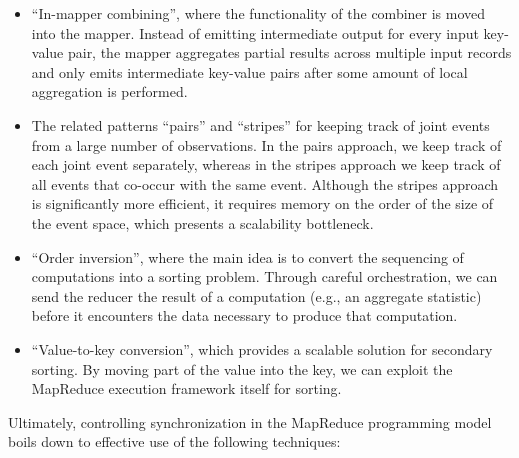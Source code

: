 \begin{itemize}

\item ``In-mapper combining'', where the functionality of the combiner
  is moved into the mapper.  Instead of emitting intermediate output
  for every input key-value pair, the mapper aggregates partial
  results across multiple input records and only emits intermediate
  key-value pairs after some amount of local aggregation is performed.

\item The related patterns ``pairs'' and ``stripes'' for keeping track
  of joint events from a large number of observations.  In the pairs
  approach, we keep track of each joint event separately, whereas in
  the stripes approach we keep track of all events that co-occur with
  the same event.  Although the stripes approach is significantly more
  efficient, it requires memory on the order of the size of the event
  space, which presents a scalability bottleneck.

\item ``Order inversion'', where the main idea is to convert the
  sequencing of computations into a sorting problem.  Through careful
  orchestration, we can send the reducer the result of a computation
  (e.g., an aggregate statistic) before it encounters the data
  necessary to produce that computation.

\item ``Value-to-key conversion'', which provides a scalable solution
  for secondary sorting.  By moving part of the value into the key, we
  can exploit the MapReduce execution framework itself for sorting.

\end{itemize}

\noindent Ultimately, controlling synchronization in the MapReduce
programming model boils down to effective use of the following
techniques:

